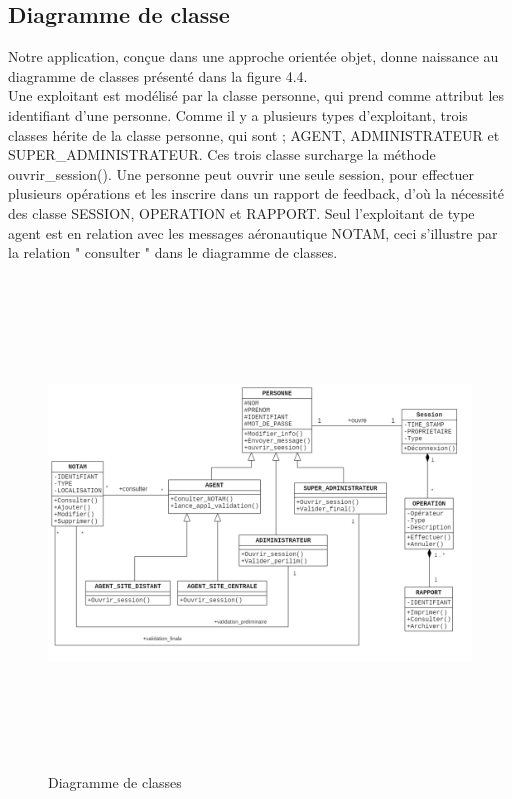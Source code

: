 \subsection{Diagramme de classe}
Notre application, conçue dans une approche orientée objet, donne naissance au diagramme de classes présenté dans la figure 4.4. \\

Une exploitant est modélisé par la classe personne, qui prend comme attribut les identifiant d’une personne. Comme il y a plusieurs types d’exploitant, trois classes hérite de la classe personne, qui sont ; AGENT, ADMINISTRATEUR et SUPER\_ADMINISTRATEUR. Ces trois classe surcharge la méthode ouvrir\_session(). Une personne peut ouvrir une seule session, pour effectuer plusieurs opérations et les inscrire dans un rapport de feedback, d’où la nécessité des classe SESSION, OPERATION et RAPPORT. Seul l’exploitant de type agent est en relation avec les messages aéronautique NOTAM, ceci s’illustre par la relation " consulter " dans le diagramme de classes.\\ 
\begin{figure}[!h]
\begin{center}
\includegraphics[width=17cm,height=13cm]{Conception/ClassDiagram1.png}
\end{center}
\caption{Diagramme de classes}

\end{figure}
\newpage
